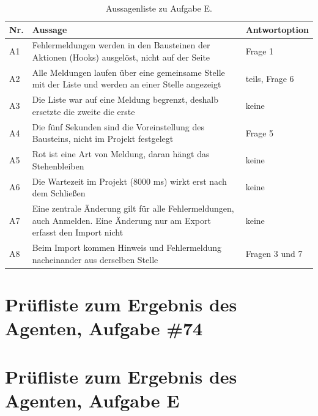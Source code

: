 \begin{table}[htbp]
  \centering
  \caption{Aussagenliste zu Aufgabe E.}
  \label{tab:aussagen-E}
  \small
  \begin{tabularx}{\textwidth}{l>{\raggedright\arraybackslash}Xl}
    \toprule
    Nr. & Aussage & Antwortoption \\
    \midrule
    A1 & Fehlermeldungen werden in den Bausteinen der Aktionen (Hooks) ausgelöst, nicht auf der Seite & Frage 1 \\
    A2 & Alle Meldungen laufen über eine gemeinsame Stelle mit der Liste und werden an einer Stelle angezeigt & teils, Frage 6 \\
    A3 & Die Liste war auf eine Meldung begrenzt, deshalb ersetzte die zweite die erste & keine \\
    A4 & Die fünf Sekunden sind die Voreinstellung des Bausteins, nicht im Projekt festgelegt & Frage 5 \\
    A5 & Rot ist eine Art von Meldung, daran hängt das Stehenbleiben & keine \\
    A6 & Die Wartezeit im Projekt (8000 ms) wirkt erst nach dem Schließen & keine \\
    A7 & Eine zentrale Änderung gilt für alle Fehlermeldungen, auch Anmelden. Eine Änderung nur am Export erfasst den Import nicht & keine \\
    A8 & Beim Import kommen Hinweis und Fehlermeldung nacheinander aus derselben Stelle & Fragen 3 und 7 \\
    \bottomrule
  \end{tabularx}
\end{table}

\section{Prüfliste zum Ergebnis des Agenten, Aufgabe \#74}
\label{app:pruefliste74}

\begin{sloppypar}

\end{sloppypar}

\section{Prüfliste zum Ergebnis des Agenten, Aufgabe E}
\label{app:prueflisteE}

\begin{sloppypar}

\end{sloppypar}

